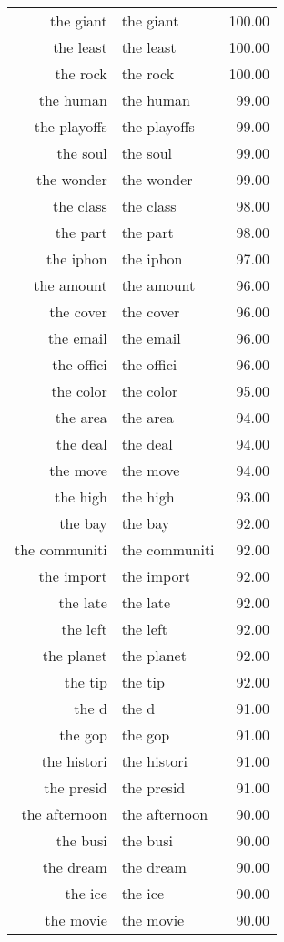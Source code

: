 \begin{table}[ht]
\begin{tabular}{rlr}
  the giant & the giant & 100.00 \\ 
  the least & the least & 100.00 \\ 
  the rock & the rock & 100.00 \\ 
  the human & the human & 99.00 \\ 
  the playoffs & the playoffs & 99.00 \\ 
  the soul & the soul & 99.00 \\ 
  the wonder & the wonder & 99.00 \\ 
  the class & the class & 98.00 \\ 
  the part & the part & 98.00 \\ 
  the iphon & the iphon & 97.00 \\ 
  the amount & the amount & 96.00 \\ 
  the cover & the cover & 96.00 \\ 
  the email & the email & 96.00 \\ 
  the offici & the offici & 96.00 \\ 
  the color & the color & 95.00 \\ 
  the area & the area & 94.00 \\ 
  the deal & the deal & 94.00 \\ 
  the move & the move & 94.00 \\ 
  the high & the high & 93.00 \\ 
  the bay & the bay & 92.00 \\ 
  the communiti & the communiti & 92.00 \\ 
  the import & the import & 92.00 \\ 
  the late & the late & 92.00 \\ 
  the left & the left & 92.00 \\ 
  the planet & the planet & 92.00 \\ 
  the tip & the tip & 92.00 \\ 
  the d & the d & 91.00 \\ 
  the gop & the gop & 91.00 \\ 
  the histori & the histori & 91.00 \\ 
  the presid & the presid & 91.00 \\ 
  the afternoon & the afternoon & 90.00 \\ 
  the busi & the busi & 90.00 \\ 
  the dream & the dream & 90.00 \\ 
  the ice & the ice & 90.00 \\ 
  the movie & the movie & 90.00 \\ 

\end{tabular}
\end{table}

